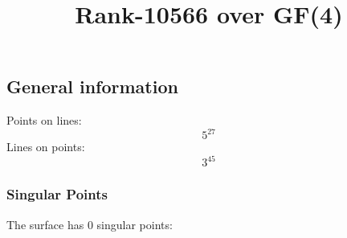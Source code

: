 \documentclass{article}
\newcommand\setTBstruts{\def\T{\rule{0pt}{2.6ex}}%
\def\B{\rule[-1.2ex]{0pt}{0pt}}}
\begin{document}
 
\setTBstruts



{\allowdisplaybreaks%






\title{Rank-10566 over GF(4)}
\author{}%
\maketitle%
%
{}



\subsection*{General information}
Points on lines:
$$
5^{27}$$
Lines on points:
$$
3^{45}$$
\subsubsection*{Singular Points}
The surface has 0 singular points:\\
\begin{align*}
\end{align*}
}
\end{document}
